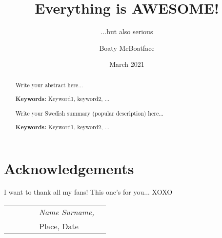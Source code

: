 \documentclass[g5paper,electronic,10pt]{kthesis}
\title{Everything is AWESOME!}
\subtitle{...but also serious}
\author{Boaty McBoatface}
\date{March 2021}
\begin{document}

\frontmatter
\maketitle

\cleardoublepage
\begin{abstract}

Write your abstract here...

\textbf{Keywords:} Keyword1, keyword2, ... 
\clearpage
\end{abstract}

\begin{abstract}

Write your Swedish summary (popular description) here...

\textbf{Keywords:} Keyword1, keyword2, ... 
\clearpage
\end{abstract}

\clearpage
\thispagestyle{empty}
\null\vfill
\begin{flushright}
\parbox{.65\linewidth}{%
}
\end{flushright}
\vfill\vfill
\clearpage

\cleardoublepage
\section*{Acknowledgements}

I want to thank all my fans! This one's for you... XOXO

\begin{table}[hb]
\begin{tabular}{lp{6.67cm}llll}
& & & & \textit{Name Surname,} \\
& & & & Place, Date
\end{tabular}
\end{table}
\cleardoublepage

\setcounter{tocdepth}{2} %
\tableofcontents
\cleardoublepage
\end{document}
